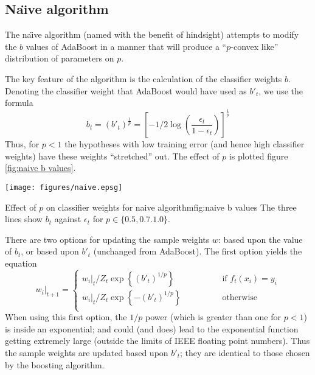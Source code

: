 \subsection{Na\"{\i}ve algorithm}

The na\"{\i}ve algorithm (named with the benefit of hindsight) attempts to
modify the $b$ values of AdaBoost in a manner that will produce a
``$p$-convex like'' distribution of parameters on $p$.

The key feature of the algorithm is the calculation of the classifier
weights $b$.  Denoting the classifier weight that AdaBoost would have
used as $b'_t$, we use the formula
%
\begin{equation}
b_t = (b'_t)^{\frac{1}{p}} = \left[ - 1/2 \log \left( \frac{\epsilon_t}{1
- \epsilon_t} \right) \right]^\frac{1}{p}
\end{equation}
%
Thus, for $p < 1$ the hypotheses with low training error (and hence
high classifier weights) have these weights ``stretched'' out.  The
effect of $p$ is plotted figure \ref{fig:naive b values}.

\begin{linefigure}
\begin{center}
\texttt{[image: figures/naive.epsg]}
\end{center}
\begin{capt}{Effect of $p$ on classifier weights for naive algorithm}{fig:naive b values}
The three lines show $b_t$ against $\epsilon_t$ for $p \in \{ 0.5,
0.7. 1.0 \}$.
\end{capt}
\end{linefigure}

There are two options for updating the sample weights $w$: based upon
the value of $b_t$, or based upon $b'_t$ (unchanged from AdaBoost).
The first option yields the equation
%
\begin{equation}
w_i|_{t+1} = \left\{
\begin{array}{cl}
	w_i|_t / Z_t \exp \left\{ (b'_t)^{1/p} \right\} & \qquad \qquad \mbox{if
	$f_t(x_i) = y_i$} \\
	w_i|_t / Z_t \exp \left\{ -(b'_t)^{1/p} \right\} 	& \qquad \qquad
	\mbox{otherwise} \\
\end{array} \right.
\end{equation}
%
When using this first option, the $1/p$ power (which is
greater than one for $p < 1$) is inside an exponential; and could
(and does) lead to the exponential function getting extremely large
(outside the limits of IEEE floating point numbers).  Thus the sample
weights are updated based upon $b'_t$; they are identical to those
chosen by the boosting algorithm.

